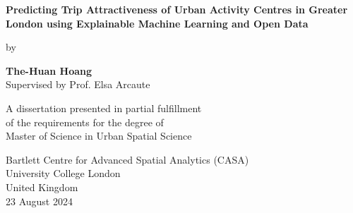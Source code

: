 
 \begin{titlepage}
    \begin{center}
        \vspace*{-3cm}
        
        \vfill %
        

        {\LARGE\textbf{Predicting Trip Attractiveness of Urban Activity Centres in Greater London using Explainable Machine Learning and Open Data\\}} 

        \vspace{2cm}
        by\\
        \vspace{1cm}
    
        \textbf{The-Huan Hoang\\}
        \vspace{0.2cm}
        Supervised by Prof. Elsa Arcaute\\
    
        \vfill
             
        A dissertation presented in partial fulfillment \\
        of the requirements for the degree of\\
        Master of Science in Urban Spatial Science
             
        \vspace{1cm}
                 
        Bartlett Centre for Advanced Spatial Analytics (CASA) \\
        University College London\\
        United Kingdom\\
        23 August 2024
    
    \end{center}
\end{titlepage}
